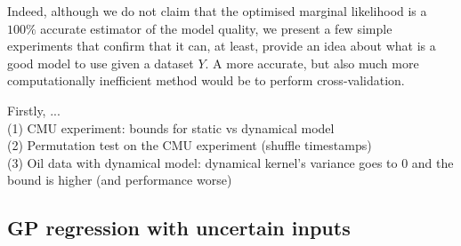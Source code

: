 Indeed, although we do not claim that the optimised marginal likelihood is a $100\%$ accurate estimator
of the model quality, we present a few simple experiments that confirm that it can, at least, provide an 
idea about what is a good model to use given a dataset $Y$. A more accurate, but also much more
computationally inefficient method would be to perform cross-validation.

Firstly, ...
 \\
(1)  CMU experiment: bounds for static vs dynamical model \\
(2)  Permutation test on the CMU experiment (shuffle timestamps) \\
(3)  Oil data with dynamical model: dynamical kernel's variance goes to 0 and the bound is higher (and performance worse)



\subsection{GP regression with uncertain inputs}


